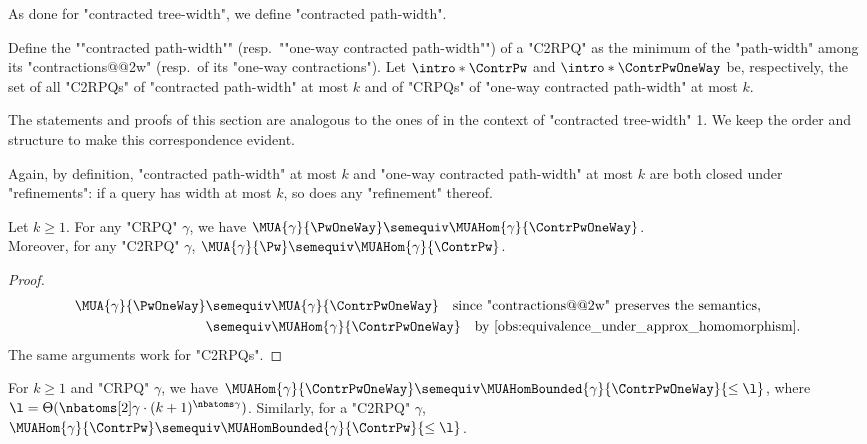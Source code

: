 As done for "contracted tree-width", we define "contracted path-width".
\begin{definition}
	\AP
	Define the ""contracted path-width"" (resp.\ ""one-way contracted path-width"")
	of a "C2RPQ" as the minimum of the "path-width" among its "contractions@@2w" (resp.\ of its "one-way contractions"). Let $\intro*\ContrPw$ and $\intro*\ContrPwOneWay$ be, respectively, the set of all "C2RPQs" of "contracted path-width" at most $k$ and of "CRPQs" of "one-way contracted path-width" at most $k$.
\end{definition}
The statements and proofs of this section are analogous to the ones of  in the context of "contracted tree-width" 1. We keep the order and structure to make this correspondence evident.

Again, by definition, "contracted path-width" at most $k$ and "one-way contracted path-width" 
at most $k$ are both closed under "refinements": if a query has width at most $k$, so does any "refinement" thereof.

\begin{fact}
	\AP\label{fact:pw-equiv-to-cpw}
	Let $k \geq 1$. For any "CRPQ" $\gamma$, we have
	$\MUA{\gamma}{\PwOneWay} \semequiv \MUAHom{\gamma}{\ContrPwOneWay}$.\\
	Moreover, for any "C2RPQ" $\gamma$,
	$\MUA{\gamma}{\Pw} \semequiv \MUAHom{\gamma}{\ContrPw}$.
\end{fact}

\begin{proof}
	\begin{align*}
		\MUA{\gamma}{\PwOneWay}
			& \semequiv \MUA{\gamma}{\ContrPwOneWay}
			\quad\text{since "contractions@@2w" preserves the semantics,} \\
			& \semequiv \MUAHom{\gamma}{\ContrPwOneWay}
			\quad\text{by \Cref{obs:equivalence_under_approx_homomorphism}.}
	\end{align*}
	The same arguments work for "C2RPQs".
\end{proof}

\begin{lemma}
    \AP\label{lemma:bound_size_refinements_pw}
    \AP For $k \geq 1$ and "CRPQ" $\gamma$, we have
    $\MUAHom{\gamma}{\ContrPwOneWay} \semequiv \MUAHomBounded{\gamma}{\ContrPwOneWay}{\leq\l}$, where
    $\l = \lbound{k}{\gamma}$.
	Similarly, for a "C2RPQ" $\gamma$,
	$\MUAHom{\gamma}{\ContrPw} \semequiv \MUAHomBounded{\gamma}{\ContrPw}{\leq\l}$.
\end{lemma}

